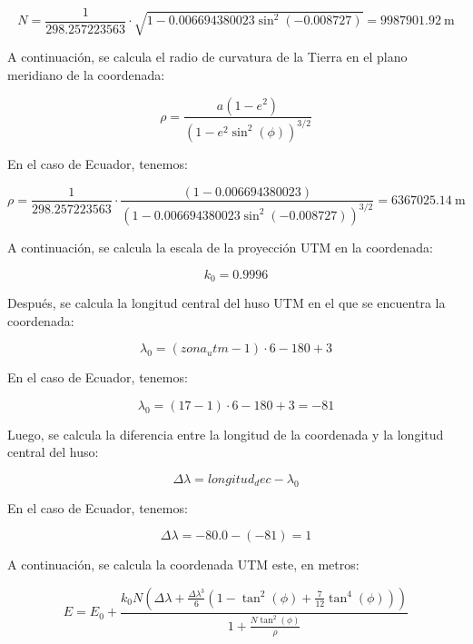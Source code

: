 \documentclass{article}
\begin{document}
\begin{equation}
N = \frac{1}{298.257223563} \cdot \sqrt{1 - 0.006694380023\sin^2(-0.008727)} = 9987901.92\ \mathrm{m}
\end{equation}

A continuación, se calcula el radio de curvatura de la Tierra en el plano meridiano de la coordenada:

\begin{equation}
\rho = \frac{a(1-e^2)}{(1-e^2\sin^2(\phi))^{3/2}}
\end{equation}

En el caso de Ecuador, tenemos:

\begin{equation}
\rho = \frac{1}{298.257223563} \cdot \frac{(1-0.006694380023)}{(1-0.006694380023\sin^2(-0.008727))^{3/2}} = 6367025.14\ \mathrm{m}
\end{equation}

A continuación, se calcula la escala de la proyección UTM en la coordenada:

\begin{equation}
k_0 = 0.9996
\end{equation}

Después, se calcula la longitud central del huso UTM en el que se encuentra la coordenada:

\begin{equation}
\lambda_0 = (zona_utm - 1) \cdot 6 - 180 + 3
\end{equation}

En el caso de Ecuador, tenemos:

\begin{equation}
\lambda_0 = (17 - 1) \cdot 6 - 180 + 3 = -81
\end{equation}

Luego, se calcula la diferencia entre la longitud de la coordenada y la longitud central del huso:

\begin{equation}
\Delta\lambda = longitud_dec - \lambda_0
\end{equation}

En el caso de Ecuador, tenemos:

\begin{equation}
\Delta\lambda = -80.0 - (-81) = 1
\end{equation}

A continuación, se calcula la coordenada UTM este, en metros:

\begin{equation}
E = E_0 + \frac{k_0 N (\Delta\lambda + \frac{\Delta\lambda^3}{6}(1-\tan^2(\phi)+\frac{7}{12}\tan^4(\phi)))}{1 + \frac{N \tan^2(\phi)}{\rho}}
\end{equation}
\end{document}
